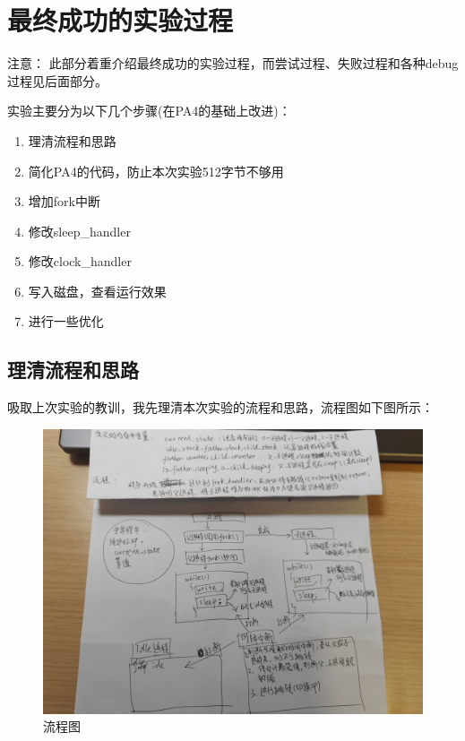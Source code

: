\documentclass{LabReport}
\begin{document}
	
	\section{最终成功的实验过程}
	
	{\color{red} 注意：} 此部分着重介绍最终成功的实验过程，而尝试过程、失败过程和各种debug过程见后面部分。\par
	\hspace{0em}实验主要分为以下几个步骤(在PA4的基础上改进)：
	
	\begin{enumerate}
		\item 理清流程和思路
		\item 简化PA4的代码，防止本次实验512字节不够用
		\item 增加fork中断
		\item 修改sleep\_handler
		\item 修改clock\_handler
		\item 写入磁盘，查看运行效果
		\item 进行一些优化
	\end{enumerate}
	
	\subsection{理清流程和思路}
	吸取上次实验的教训，我先理清本次实验的流程和思路，流程图如下图所示：
	
\begin{figure}[h!]
	\centering
	\includegraphics[width=1\linewidth]{figures/flow_chart}
	\caption{流程图}
	\label{fig:flowchart}
\end{figure}
\end{document}
